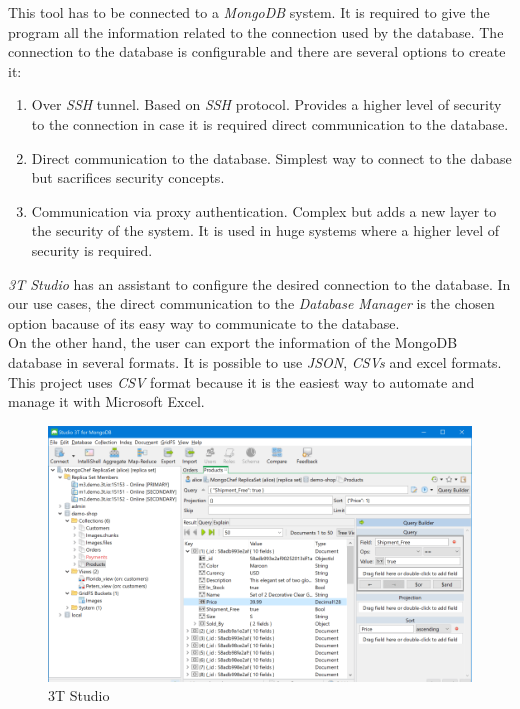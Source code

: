 This tool has to be connected to a \textit{MongoDB} system. It is required to give the program all the information related to the connection used by the database. The connection to the database is configurable and there are several options to create it:

\begin{enumerate}

\item Over \textit{SSH} tunnel. Based on \textit{SSH} protocol. Provides a higher level of security to the connection in case it is required direct communication to the database.
\item Direct communication to the database. Simplest way to connect to the dabase but sacrifices security concepts.
\item Communication via proxy authentication. Complex but adds a new layer to the security of the system. It is used in huge systems where a higher level of security is required.

\end{enumerate}


\textit{3T Studio} has an assistant to configure the desired connection to the database. In our use cases, the direct communication to the \textit{Database Manager} is the chosen option bacause of its easy way to communicate to the database.\\

On the other hand, the user can export the information of the MongoDB database in several formats. It is possible to use \textit{JSON}, \textit{CSVs} and excel formats. This project uses \textit{CSV} format because it is the easiest way to automate and manage it with Microsoft Excel.

\begin{figure}[H]
\begin{centering}
\includegraphics[scale=0.4]{IMGS/3T_STUDIO.png}
\caption{3T Studio \label{3T_STUDIO}}
\end{centering}
\end{figure}

